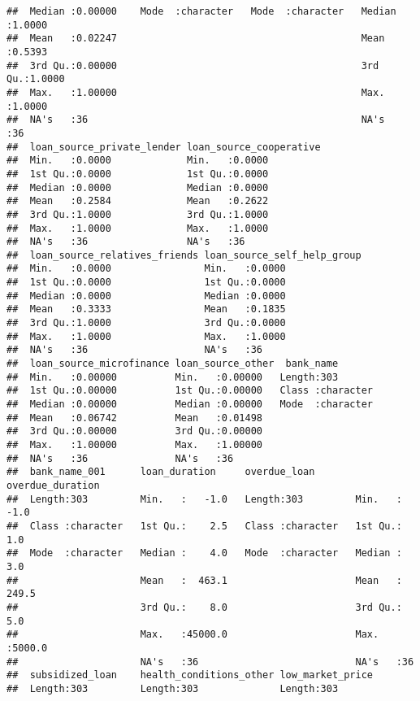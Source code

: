 \documentclass[
]{article}
\begin{document}
\begin{verbatim}
##  Median :0.00000    Mode  :character   Mode  :character   Median :1.0000  
##  Mean   :0.02247                                          Mean   :0.5393  
##  3rd Qu.:0.00000                                          3rd Qu.:1.0000  
##  Max.   :1.00000                                          Max.   :1.0000  
##  NA's   :36                                               NA's   :36      
##  loan_source_private_lender loan_source_cooperative
##  Min.   :0.0000             Min.   :0.0000         
##  1st Qu.:0.0000             1st Qu.:0.0000         
##  Median :0.0000             Median :0.0000         
##  Mean   :0.2584             Mean   :0.2622         
##  3rd Qu.:1.0000             3rd Qu.:1.0000         
##  Max.   :1.0000             Max.   :1.0000         
##  NA's   :36                 NA's   :36             
##  loan_source_relatives_friends loan_source_self_help_group
##  Min.   :0.0000                Min.   :0.0000             
##  1st Qu.:0.0000                1st Qu.:0.0000             
##  Median :0.0000                Median :0.0000             
##  Mean   :0.3333                Mean   :0.1835             
##  3rd Qu.:1.0000                3rd Qu.:0.0000             
##  Max.   :1.0000                Max.   :1.0000             
##  NA's   :36                    NA's   :36                 
##  loan_source_microfinance loan_source_other  bank_name        
##  Min.   :0.00000          Min.   :0.00000   Length:303        
##  1st Qu.:0.00000          1st Qu.:0.00000   Class :character  
##  Median :0.00000          Median :0.00000   Mode  :character  
##  Mean   :0.06742          Mean   :0.01498                     
##  3rd Qu.:0.00000          3rd Qu.:0.00000                     
##  Max.   :1.00000          Max.   :1.00000                     
##  NA's   :36               NA's   :36                          
##  bank_name_001      loan_duration     overdue_loan       overdue_duration
##  Length:303         Min.   :   -1.0   Length:303         Min.   :  -1.0  
##  Class :character   1st Qu.:    2.5   Class :character   1st Qu.:   1.0  
##  Mode  :character   Median :    4.0   Mode  :character   Median :   3.0  
##                     Mean   :  463.1                      Mean   : 249.5  
##                     3rd Qu.:    8.0                      3rd Qu.:   5.0  
##                     Max.   :45000.0                      Max.   :5000.0  
##                     NA's   :36                           NA's   :36      
##  subsidized_loan    health_conditions_other low_market_price  
##  Length:303         Length:303              Length:303        

\end{verbatim}
\end{document}
